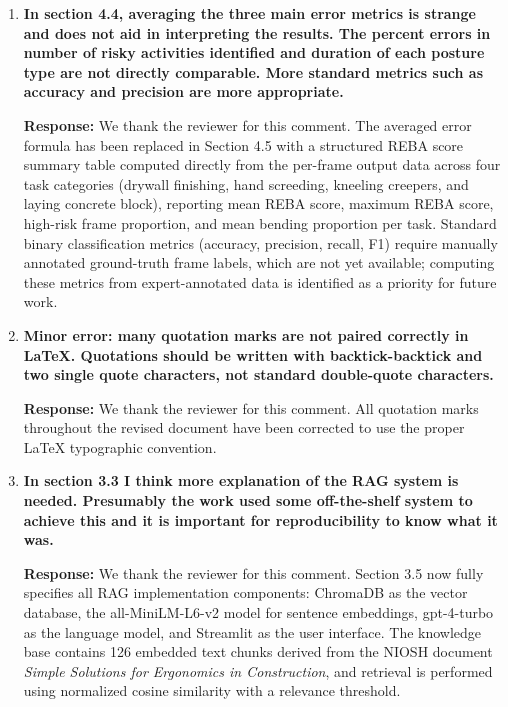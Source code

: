 \begin{enumerate}
    \textbf{Response:} We thank the reviewer for this comment. We agree with this observation. A sentence has been added to Section 3.2 acknowledging that when keypoint confidence falls below the threshold, the model outputs a coordinate of $(0,0)$ --- the image origin --- and that the smoothing function primarily serves as a missing-data interpolation mechanism rather than a jitter filter. The Figure 4 description in Section 4.2 has been updated to explicitly describe the $(0,0)$ artefact visible in the unsmoothed sequences and explain how smoothing suppresses it.

    \item \textbf{In section 4.4, averaging the three main error metrics is strange and does not aid in interpreting the results. The percent errors in number of risky activities identified and duration of each posture type are not directly comparable. More standard metrics such as accuracy and precision are more appropriate.}

    \textbf{Response:} We thank the reviewer for this comment. The averaged error formula has been replaced in Section 4.5 with a structured REBA score summary table computed directly from the per-frame output data across four task categories (drywall finishing, hand screeding, kneeling creepers, and laying concrete block), reporting mean REBA score, maximum REBA score, high-risk frame proportion, and mean bending proportion per task. Standard binary classification metrics (accuracy, precision, recall, F1) require manually annotated ground-truth frame labels, which are not yet available; computing these metrics from expert-annotated data is identified as a priority for future work.

    \item \textbf{Minor error: many quotation marks are not paired correctly in LaTeX. Quotations should be written with backtick-backtick and two single quote characters, not standard double-quote characters.}

    \textbf{Response:} We thank the reviewer for this comment. All quotation marks throughout the revised document have been corrected to use the proper LaTeX typographic convention.

    \item \textbf{In section 3.3 I think more explanation of the RAG system is needed. Presumably the work used some off-the-shelf system to achieve this and it is important for reproducibility to know what it was.}

    \textbf{Response:} We thank the reviewer for this comment. Section 3.5 now fully specifies all RAG implementation components: ChromaDB as the vector database, the all-MiniLM-L6-v2 model for sentence embeddings, gpt-4-turbo as the language model, and Streamlit as the user interface. The knowledge base contains 126 embedded text chunks derived from the NIOSH document \emph{Simple Solutions for Ergonomics in Construction}, and retrieval is performed using normalized cosine similarity with a relevance threshold.
\end{enumerate}
